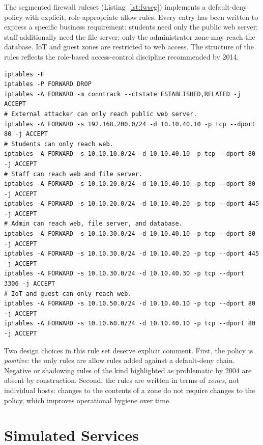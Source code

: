 The segmented firewall ruleset (Listing~\ref{lst:fwseg}) implements a default-deny policy with explicit, role-appropriate allow rules. Every entry has been written to express a specific business requirement: students need only the public web server; staff additionally need the file server; only the administrator zone may reach the database. IoT and guest zones are restricted to web access. The structure of the rules reflects the role-based access-control discipline recommended by \textcite{Hu et al.}{2014}.

\begin{lstlisting}[style=shellstyle, caption={Segmented firewall ruleset (excerpt)}, label=lst:fwseg]
iptables -F
iptables -P FORWARD DROP
iptables -A FORWARD -m conntrack --ctstate ESTABLISHED,RELATED -j ACCEPT
# External attacker can only reach public web server.
iptables -A FORWARD -s 192.168.200.0/24 -d 10.10.40.10 -p tcp --dport 80 -j ACCEPT
# Students can only reach web.
iptables -A FORWARD -s 10.10.10.0/24 -d 10.10.40.10 -p tcp --dport 80 -j ACCEPT
# Staff can reach web and file server.
iptables -A FORWARD -s 10.10.20.0/24 -d 10.10.40.10 -p tcp --dport 80 -j ACCEPT
iptables -A FORWARD -s 10.10.20.0/24 -d 10.10.40.20 -p tcp --dport 445 -j ACCEPT
# Admin can reach web, file server, and database.
iptables -A FORWARD -s 10.10.30.0/24 -d 10.10.40.10 -p tcp --dport 80 -j ACCEPT
iptables -A FORWARD -s 10.10.30.0/24 -d 10.10.40.20 -p tcp --dport 445 -j ACCEPT
iptables -A FORWARD -s 10.10.30.0/24 -d 10.10.40.30 -p tcp --dport 3306 -j ACCEPT
# IoT and guest can only reach web.
iptables -A FORWARD -s 10.10.50.0/24 -d 10.10.40.10 -p tcp --dport 80 -j ACCEPT
iptables -A FORWARD -s 10.10.60.0/24 -d 10.10.40.10 -p tcp --dport 80 -j ACCEPT
\end{lstlisting}

Two design choices in this rule set deserve explicit comment. First, the policy is \emph{positive}: the only rules are allow rules added against a default-deny chain. Negative or shadowing rules of the kind highlighted as problematic by \textcite{Wool}{2004} are absent by construction. Second, the rules are written in terms of \emph{zones}, not individual hosts: changes to the contents of a zone do not require changes to the policy, which improves operational hygiene over time.

\section{Simulated Services}

